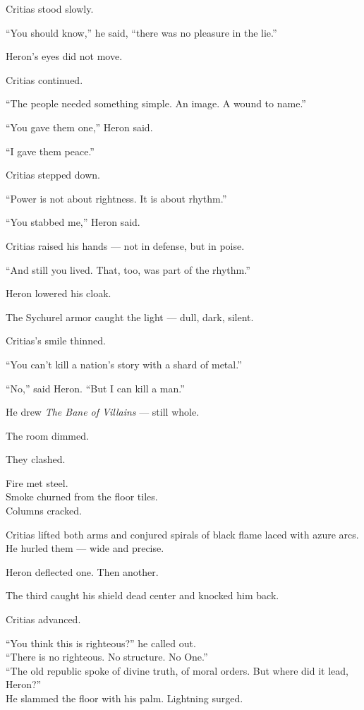 \documentclass[12pt]{article}
\begin{document}
Critias stood slowly.

“You should know,” he said, “there was no pleasure in the lie.”

Heron’s eyes did not move.

Critias continued.

“The people needed something simple. An image. A wound to name.”

“You gave them one,” Heron said.

“I gave them peace.”

\vspace{1em}

Critias stepped down.

“Power is not about rightness. It is about rhythm.”

“You stabbed me,” Heron said.

Critias raised his hands — not in defense, but in poise.

“And still you lived. That, too, was part of the rhythm.”

\vspace{1em}

Heron lowered his cloak.

The Sychurel armor caught the light — dull, dark, silent.

Critias’s smile thinned.

“You can’t kill a nation’s story with a shard of metal.”

“No,” said Heron. “But I can kill a man.”

He drew \textit{The Bane of Villains} — still whole.

The room dimmed.

\vspace{1em}

They clashed.

Fire met steel.\\
Smoke churned from the floor tiles.\\
Columns cracked.

Critias lifted both arms and conjured spirals of black flame laced with azure arcs.\\
He hurled them — wide and precise.

Heron deflected one. Then another.

The third caught his shield dead center and knocked him back.

\vspace{1em}

Critias advanced.

“You think this is righteous?” he called out.\\
“There is no righteous. No structure. No One.”\\
“The old republic spoke of divine truth, of moral orders. But where did it lead, Heron?”\\
He slammed the floor with his palm. Lightning surged.
\end{document}
